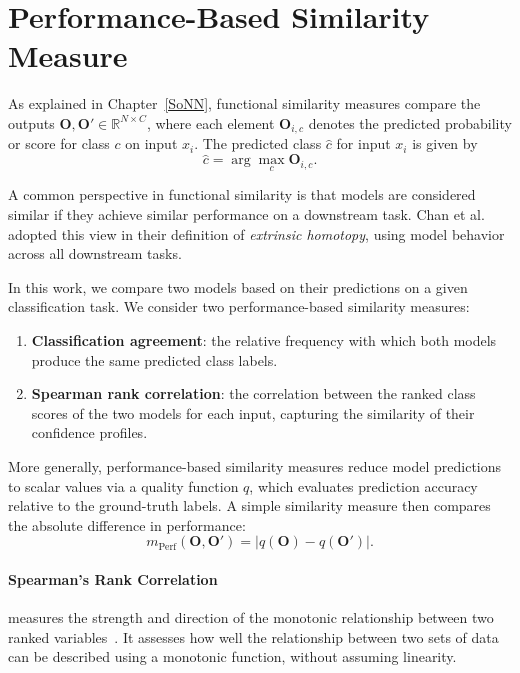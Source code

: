 
\section{Performance-Based Similarity Measure}\label{sec:PBSM}

As explained in Chapter~\ref{SoNN}, functional similarity measures compare the outputs $\mathbf{O}, \mathbf{O}' \in \mathbb{R}^{N\times C}$, where each element $\mathbf{O}_{i,c}$ denotes the predicted probability or score for class $c$ on input $x_i$. The predicted class $\hat{c}$ for input $x_i$ is given by
\[
\hat{c} = \arg \max_c \mathbf{O}_{i,c}.
\]

A common perspective in functional similarity is that models are considered similar if they achieve similar performance on a downstream task. Chan et al.~\cite{chan_affine_2024} adopted this view in their definition of \emph{extrinsic homotopy}, using model behavior across all downstream tasks.

In this work, we compare two models based on their predictions on a given classification task. We consider two performance-based similarity measures:
\begin{enumerate}
    \item \textbf{Classification agreement}: the relative frequency with which both models produce the same predicted class labels.
    \item \textbf{Spearman rank correlation}: the correlation between the ranked class scores of the two models for each input, capturing the similarity of their confidence profiles.
\end{enumerate}

More generally, performance-based similarity measures reduce model predictions to scalar values via a quality function $q$, which evaluates prediction accuracy relative to the ground-truth labels. A simple similarity measure then compares the absolute difference in performance:
\[
m_{\mathrm{Perf}}(\mathbf{O}, \mathbf{O}') = \left| q(\mathbf{O}) - q(\mathbf{O}') \right|.
\]

\paragraph{Spearman's Rank Correlation}
measures the strength and direction of the monotonic relationship between two ranked variables~\cite{sammut_encyclopedia_2017}.
It assesses how well the relationship between two sets of data can be described using a monotonic function, without assuming linearity.

